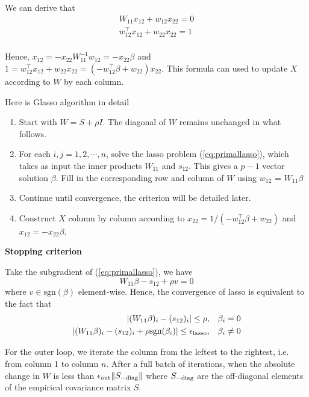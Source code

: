 \documentclass[conference,onecolumn,12pt]{IEEEtran}
\newcommand{\<}{\langle}
\renewcommand{\>}{\rangle}
\newcommand{\sgn}[1]{\textrm{sgn}(#1)}
\numberwithin{equation}{section}
\begin{document}
    We can derive that
    \begin{equation}
        \begin{split}
            W_{11}x_{12}+w_{12}x_{22}=0\\
            w_{12}^\top  x_{12}+w_{22}x_{22} = 1\\
        \end{split}
    \end{equation}

    Hence, $x_{12}=-x_{22}W_{11}^{-1}w_{12}=-x_{22}\beta$ and $1=w_{12}^\top x_{12}+w_{22}x_{22}=(-w_{12}^\top  \beta +w_{22})x_{22}$. This formula can used to update $X$ according to $W$ by each column.

    Here is Glasso algorithm in detail
    \begin{enumerate}
        \item Start with $W = S +\rho I$. The diagonal of $W$ remains unchanged
        in what follows.
        \item For each $i, j = 1, 2,\cdots, n$, solve the lasso problem
        (\ref{eq:primallasso}), which takes as input the inner products $W_{11}$ and $s_{12}$. This gives a $p- 1$ vector solution $\beta$. Fill in the corresponding row and column of $W$ using $w_{12}$ = $W_{11}\beta$
        \item Continue until convergence, the criterion will be detailed later.
        \item Construct $X$ column by column according to $x_{22}=1/(-w_{12}^\top  \beta +w_{22})$ and $x_{12}=-x_{22}\beta$.
    \end{enumerate}

    {\bf Stopping criterion}

    Take the subgradient of (\ref{eq:primallasso}), we have
    \begin{equation}
        W_{11}\beta -s_{12}+\rho v = 0
    \end{equation}
    where $v\in \sgn{\beta}$ element-wise. Hence, the convergence of lasso is equivalent to the fact that
    \begin{equation}
        \begin{split}
            |(W_{11}\beta)_i -(s_{12})_i|\leq \rho,\quad &\beta_i=0\\
            |(W_{11}\beta)_i -(s_{12})_i+\rho\sgn{\beta_i}|\leq \epsilon_{\rm lasso},\quad &\beta_i\neq 0
        \end{split}
    \end{equation}

    For the outer loop, we iterate the column from the leftest to the rightest, i.e. from column 1 to column $n$. After a full batch of iterations, when the absolute change in $W$ is less than
    $\epsilon_{\rm out} \|S_{\rm -diag}\|$ where $S_{\rm -diag}$ are the off-diagonal elements of the empirical covariance matrix $S$.
\end{document}
